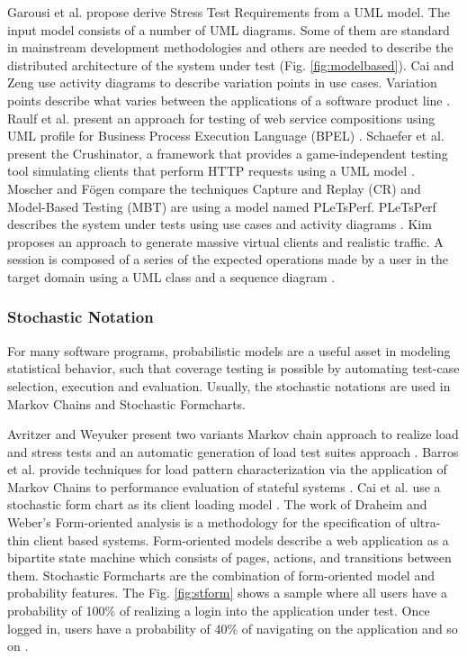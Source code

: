 \documentclass[espaco=umemeio,chapter=TITLE,twoside,openright]{abnt}
\begin{document}
Garousi et al. propose derive Stress Test Requirements from a UML model. The input model consists of a number of UML diagrams. Some of them are standard in mainstream development methodologies and others are needed to describe the distributed architecture of the system under test (Fig. \ref{fig:modelbased}). Cai and Zeng use activity diagrams to describe variation points in use cases. Variation points describe what varies between the applications of a software product line \cite{XinyingCai2007}. Raulf et al. present an approach for testing of web service compositions using UML profile for Business Process Execution Language (BPEL) \cite{Rauf2009}. Schaefer et al. present the Crushinator, a framework that provides a game-independent testing tool simulating clients that perform HTTP requests using a UML model \cite{Schaefer2013}. Moscher and  Fögen compare the techniques Capture and Replay (CR) and Model-Based Testing (MBT) are using a model named PLeTsPerf. PLeTsPerf describes the system under tests using use cases and activity diagrams \cite{moscher2017facing}. Kim proposes an approach to generate massive virtual clients and realistic traffic. A session is composed of a series of the expected operations made by a user in the target domain using a UML class and a sequence diagram \cite{Kim2005}.



\subsubsection{Stochastic Notation}


For many software programs, probabilistic models are a useful asset in
modeling statistical behavior, such that coverage testing is possible by automating
test-case selection, execution and evaluation. Usually, the stochastic notations are used in Markov Chains and Stochastic Formcharts. 

Avritzer and Weyuker present two variants Markov chain approach to realize load and stress tests and an automatic generation of load test suites approach \cite{Avritzer1993} \cite{Avritzer1995b}. Barros et al. provide techniques for load pattern characterization via the application of Markov Chains to performance evaluation of stateful systems \cite{Barros2007}. Cai et al. use a stochastic form chart as its client loading model \cite{Cai2007}. The work of Draheim and Weber’s Form-oriented analysis is a methodology for the specification of ultra-thin client based systems. Form-oriented models describe a web application as a bipartite state machine which consists of pages, actions, and transitions between them. Stochastic Formcharts are the combination of form-oriented model and probability features. The Fig. \ref{fig:stform} shows a sample where all users have a probability of 100\% of realizing a login into the application under test. Once logged in, users have a probability of 40\% of navigating on the application and so on \cite{Draheim2006b} \cite{Marinescu2015}.
\end{document}
